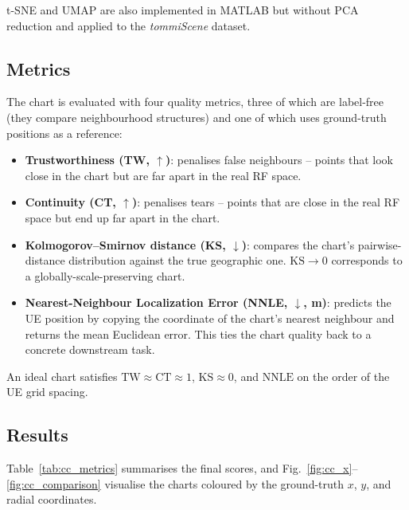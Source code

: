 t-SNE and UMAP are also implemented in MATLAB but without PCA reduction and applied to the \emph{tommiScene} dataset. 

\subsection{Metrics}

The chart is evaluated with four quality metrics, three of which are
label-free (they compare neighbourhood structures) and one of which uses
ground-truth positions as a reference:
\begin{itemize}
  \item \textbf{Trustworthiness (TW, $\uparrow$)}: penalises false
        neighbours -- points that look close in the chart but are far
        apart in the real RF space.
  \item \textbf{Continuity (CT, $\uparrow$)}: penalises tears -- points
        that are close in the real RF space but end up far apart in the
        chart.
  \item \textbf{Kolmogorov--Smirnov distance (KS, $\downarrow$)}: compares
        the chart's pairwise-distance distribution against the true
        geographic one.  $\text{KS}\to 0$ corresponds to a
        globally-scale-preserving chart.
  \item \textbf{Nearest-Neighbour Localization Error
        (NNLE, $\downarrow$, m)}: predicts the UE position by copying the
        coordinate of the chart's nearest neighbour and returns the mean
        Euclidean error.  This ties the chart quality back to a concrete
        downstream task.
\end{itemize}
An ideal chart satisfies $\text{TW}\approx\text{CT}\approx 1$,
$\text{KS}\approx 0$, and $\text{NNLE}$ on the order of the UE grid
spacing.

\subsection{Results}

Table~\ref{tab:cc_metrics} summarises the final scores, and
Fig.~\ref{fig:cc_x}--\ref{fig:cc_comparison} visualise the charts
coloured by the ground-truth $x$, $y$, and radial coordinates.

